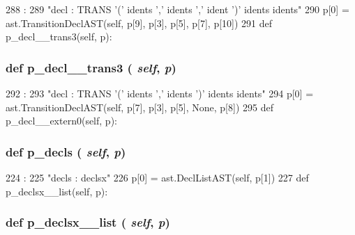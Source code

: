 \begin{DoxyCode}
288                                :
289         "decl : TRANS '(' idents ',' idents ',' ident ')' idents idents"
290         p[0] = ast.TransitionDeclAST(self, p[9], p[3], p[5], p[7], p[10])
291 
    def p_decl__trans3(self, p):
\end{DoxyCode}
\hypertarget{classslicc_1_1parser_1_1SLICC_a69bd0583b00861f1330c5b18b4a6098e}{
\subsubsection[{p\_\-decl\_\-\_\-trans3}]{\setlength{\rightskip}{0pt plus 5cm}def p\_\-decl\_\-\_\-trans3 ( {\em self}, \/   {\em p})}}
\label{classslicc_1_1parser_1_1SLICC_a69bd0583b00861f1330c5b18b4a6098e}



\begin{DoxyCode}
292                                :
293         "decl : TRANS '(' idents ',' idents ')' idents idents"
294         p[0] = ast.TransitionDeclAST(self, p[7], p[3], p[5], None, p[8])
295 
    def p_decl__extern0(self, p):
\end{DoxyCode}
\hypertarget{classslicc_1_1parser_1_1SLICC_ad3b1c7d6226207bd7fea005132d76f8a}{
\subsubsection[{p\_\-decls}]{\setlength{\rightskip}{0pt plus 5cm}def p\_\-decls ( {\em self}, \/   {\em p})}}
\label{classslicc_1_1parser_1_1SLICC_ad3b1c7d6226207bd7fea005132d76f8a}



\begin{DoxyCode}
224                         :
225         "decls : declsx"
226         p[0] = ast.DeclListAST(self, p[1])
227 
    def p_declsx__list(self, p):
\end{DoxyCode}
\hypertarget{classslicc_1_1parser_1_1SLICC_acb0caf90d07f145174cc4ac0d391cddf}{
\subsubsection[{p\_\-declsx\_\-\_\-list}]{\setlength{\rightskip}{0pt plus 5cm}def p\_\-declsx\_\-\_\-list ( {\em self}, \/   {\em p})}}
\label{classslicc_1_1parser_1_1SLICC_acb0caf90d07f145174cc4ac0d391cddf}



